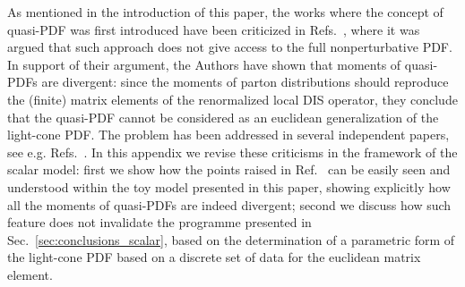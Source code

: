As mentioned in the introduction of this paper, the works where the concept of
quasi-PDF was first introduced have been criticized in
Refs.~\cite{Rossi:2017muf, Rossi:2018zkn}, where it was argued that such
approach does not give access to the full nonperturbative PDF. In support of
their argument, the Authors have shown that moments of quasi-PDFs are divergent:
since the moments of parton distributions should reproduce the (finite) matrix
elements of the renormalized local DIS operator, they conclude that the
quasi-PDF cannot be considered as an euclidean generalization of the light-cone
PDF. The problem has been addressed in several independent papers, see e.g.
Refs.~\cite{Ji:2017rah, Radyushkin:2018nbf, Karpie:2018zaz}. In this appendix we
revise these criticisms in the framework of the scalar model: first we show how
the points raised in Ref.~\cite{Rossi:2017muf, Rossi:2018zkn} can be easily seen
and understood within the toy model presented in this paper, showing explicitly
how all the moments of quasi-PDFs are indeed divergent; second we discuss how
such feature does not invalidate the programme presented in
Sec.~\ref{sec:conclusions_scalar}, based on the determination of a parametric form of
the light-cone PDF based on a discrete set of data for the euclidean matrix
element.

